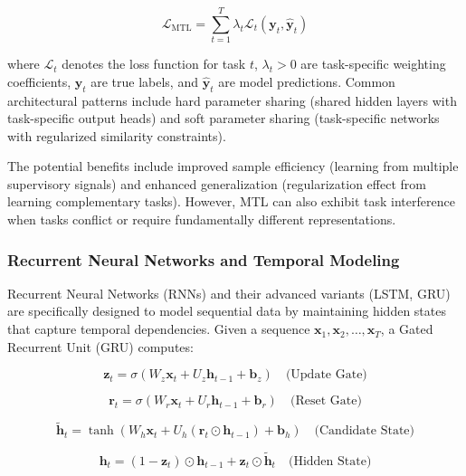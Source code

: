 \begin{equation}
\mathcal{L}_{\text{MTL}} = \sum_{t=1}^{T} \lambda_t \mathcal{L}_t(\mathbf{y}_t, \hat{\mathbf{y}}_t)
\end{equation}

where $\mathcal{L}_t$ denotes the loss function for task $t$, $\lambda_t > 0$ are task-specific weighting coefficients, $\mathbf{y}_t$ are true labels, and $\hat{\mathbf{y}}_t$ are model predictions. Common architectural patterns include hard parameter sharing (shared hidden layers with task-specific output heads) and soft parameter sharing (task-specific networks with regularized similarity constraints).

The potential benefits include improved sample efficiency (learning from multiple supervisory signals) and enhanced generalization (regularization effect from learning complementary tasks). However, MTL can also exhibit task interference when tasks conflict or require fundamentally different representations.

\subsubsection{Recurrent Neural Networks and Temporal Modeling}

Recurrent Neural Networks (RNNs) and their advanced variants (LSTM, GRU) are specifically designed to model sequential data by maintaining hidden states that capture temporal dependencies. Given a sequence $\mathbf{x}_1, \mathbf{x}_2, \ldots, \mathbf{x}_T$, a Gated Recurrent Unit (GRU) computes:

\begin{equation}
\mathbf{z}_t = \sigma(W_z\mathbf{x}_t + U_z\mathbf{h}_{t-1} + \mathbf{b}_z) \quad \text{(Update Gate)}
\end{equation}

\begin{equation}
\mathbf{r}_t = \sigma(W_r\mathbf{x}_t + U_r\mathbf{h}_{t-1} + \mathbf{b}_r) \quad \text{(Reset Gate)}
\end{equation}

\begin{equation}
\tilde{\mathbf{h}}_t = \tanh(W_h\mathbf{x}_t + U_h(\mathbf{r}_t \odot \mathbf{h}_{t-1}) + \mathbf{b}_h) \quad \text{(Candidate State)}
\end{equation}

\begin{equation}
\mathbf{h}_t = (1 - \mathbf{z}_t) \odot \mathbf{h}_{t-1} + \mathbf{z}_t \odot \tilde{\mathbf{h}}_t \quad \text{(Hidden State)}
\end{equation}

